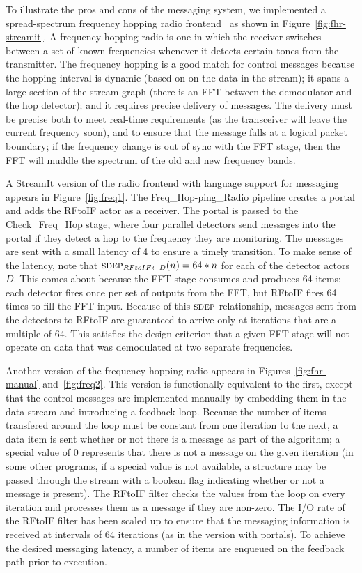 To illustrate the pros and cons of the messaging system, we
implemented a spread-spectrum frequency hopping radio
frontend~\cite{harada02} as shown in Figure~\ref{fig:fhr-streamit}.  A
frequency hopping radio is one in which the receiver switches between
a set of known frequencies whenever it detects certain tones from the
transmitter.  The frequency hopping is a good match for control
messages because the hopping interval is dynamic (based on on the data
in the stream); it spans a large section of the stream graph (there is
an FFT between the demodulator and the hop detector); and it requires
precise delivery of messages.  The delivery must be precise both to
meet real-time requirements (as the transceiver will leave the current
frequency soon), and to ensure that the message falls at a logical
packet boundary; if the frequency change is out of sync with the FFT
stage, then the FFT will muddle the spectrum of the old and new
frequency bands.

A StreamIt version of the radio frontend with language support for
messaging appears in Figure~\ref{fig:freq1}.  The
Freq\_Hop-ping\_Radio pipeline creates a portal and adds the RFtoIF
actor as a receiver.  The portal is passed to the Check\_Freq\_Hop
stage, where four parallel detectors send messages into the portal if
they detect a hop to the frequency they are monitoring.  The messages
are sent with a small latency of 4 to ensure a timely transition.  To
make sense of the latency, note that $\sdepf{RFtoIF}{D}(n) = 64*n$ for
each of the detector actors $D$.  This comes about because the FFT
stage consumes and produces 64 items; each detector fires once per set
of outputs from the FFT, but RFtoIF fires 64 times to fill the FFT
input.  Because of this $\textsc{sdep}$ relationship, messages sent from the
detectors to RFtoIF are guaranteed to arrive only at iterations that
are a multiple of 64.  This satisfies the design criterion that a
given FFT stage will not operate on data that was demodulated at two
separate frequencies.

Another version of the frequency hopping radio appears in
Figures~\ref{fig:fhr-manual} and~\ref{fig:freq2}.  This version is
functionally equivalent to the first, except that the control messages
are implemented manually by embedding them in the data stream and
introducing a feedback loop.  Because the number of items transfered
around the loop must be constant from one iteration to the next, a
data item is sent whether or not there is a message as part of the
algorithm; a special value of 0 represents that there is not a message
on the given iteration (in some other programs, if a special value is
not available, a structure may be passed through the stream with a
boolean flag indicating whether or not a message is present).  The
RFtoIF filter checks the values from the loop on every iteration and
processes them as a message if they are non-zero.  The I/O rate of the
RFtoIF filter has been scaled up to ensure that the messaging
information is received at intervals of 64 iterations (as in the
version with portals).  To achieve the desired messaging latency, a
number of items are enqueued on the feedback path prior to execution.

